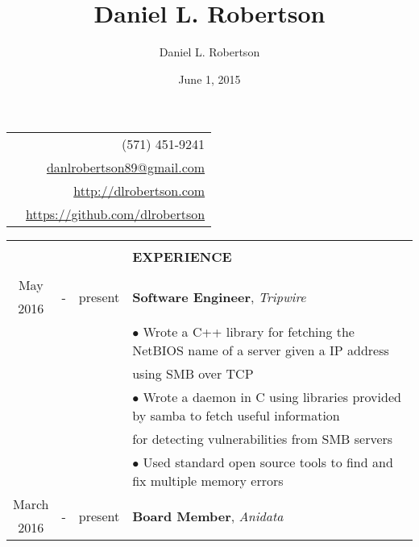 \documentclass[10pt]{article}
\title{Daniel L. Robertson}
\date{June 1, 2015}
\author{Daniel L. Robertson}
\begin{document}
    \normalfont
    \begin{table}[ht]
        \begin{tabular}{p{13cm}r}
            \multirow{4}{*}{\hspace*{1cm}\color{maroon}{\huge\textbf{Daniel L. Robertson}}} & (571) 451-9241\\
            & \href{mailto:danlrobertson89@gmail.com}{danlrobertson89@gmail.com}\\
            & \href{http://dlrobertson.com}{http://dlrobertson.com}\\
            & \href{https://github.com/dlrobertson}{https://github.com/dlrobertson}\\
        \end{tabular}
        \begin{tabular}{@{\hspace{0mm}}c@{\hspace{1mm}}c@{\hspace{3mm}}cl}
            & & & \color{maroon}{\rule{14cm}{0.75pt}}\\
            & & & \large{\textbf{EXPERIENCE}}\\[-2mm]
            & & & \color{maroon}{\rule{14cm}{0.75pt}}\\
            May & \multirow{2}{*}{-} & \multirow{2}{*}{present} & \multirow{2}{*}{\textbf{Software Engineer}, \textit{Tripwire}}\\
            2016 & & &\\
            & & & $\bullet$ Wrote a C++ library for fetching the NetBIOS name of a server given a IP address\\
            & & & \hspace*{4mm}using SMB over TCP\\
            & & & $\bullet$ Wrote a daemon in C using libraries provided by samba to fetch useful information\\
            & & & \hspace*{4mm}for detecting vulnerabilities from SMB servers\\
            & & & $\bullet$ Used standard open source tools to find and fix multiple memory errors\\
            March & \multirow{2}{*}{-} & \multirow{2}{*}{present} & \multirow{2}{*}{\textbf{Board Member}, \textit{Anidata}}\\
            2016 & & &\\

\end{tabular}
\end{table}
\end{document}
